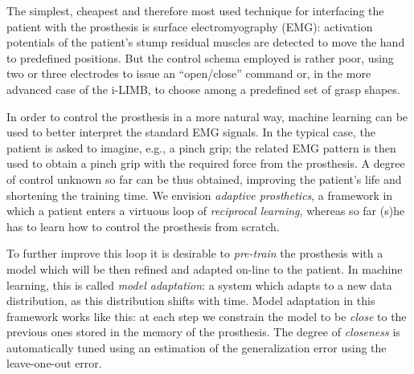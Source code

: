 The simplest, cheapest and therefore most used technique for
interfacing the patient with the prosthesis is surface
electromyography (EMG): activation potentials of the patient's stump
residual muscles are detected to move the hand to predefined
positions. But the control schema employed is rather poor, using two
or three electrodes to issue an ``open/close'' command or, in the more
advanced case of the i-LIMB, to choose among a predefined set of grasp
shapes.


In order to control the prosthesis in a more natural way, machine
learning can be used to better interpret the standard EMG signals. In
the typical case, the patient is asked to imagine, e.g., a pinch grip;
the related EMG pattern is then used to obtain a pinch grip with the
required force from the prosthesis. A degree of control unknown so far
can be thus obtained, improving the patient's life and shortening the
training time. We envision \emph{adaptive prosthetics}, a framework in
which a patient enters a virtuous loop of \emph{reciprocal learning},
whereas so far (s)he has to learn how to control the prosthesis from
scratch.


To further improve this loop it is desirable to \emph{pre-train} the
prosthesis with a model which will be then refined and adapted on-line
to the patient. In machine learning, this is called \emph{model
adaptation}: a system which adapts to a new data distribution, as this
distribution shifts with time. Model adaptation in this framework
works like this: at each step we constrain the model to be \emph{close}
to the previous ones stored in the memory of the prosthesis. The degree
of \emph{closeness} is automatically tuned using an estimation of the
generalization error using the leave-one-out error.

